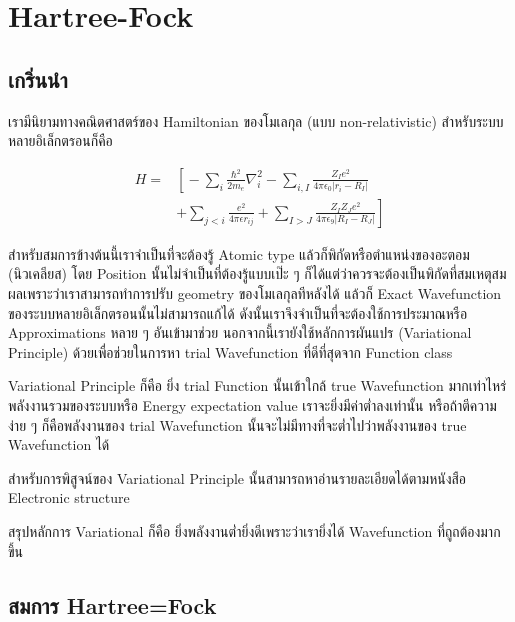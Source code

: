 
\chapter{Hartree-Fock}

\section{เกริ่นนำ}

เรามีนิยามทางคณิตศาสตร์ของ Hamiltonian ของโมเลกุล (แบบ non-relativistic) สำหรับระบบหลายอิเล็กตรอนก็คือ

\begin{equation}
    \begin{aligned}
        H = &
        \left[ \right.
        -\sum_{i} \frac{\hbar^{2}}{2m_{e}} \nabla^{2}_{i}
        -\sum_{i,I} \frac{Z_{I} e^{2}}{4\pi\epsilon_{0} |r_{i} - R_{I}|} \\
            & +\sum_{j<i} \frac{e^{2}}{4\pi\epsilon r_{ij}}
        +\sum_{I>J} \frac{Z_{I} Z_{J} e^{2}}{4\pi\epsilon_{9} |R_{I} - R_{J}|}
        \left. \right]
    \end{aligned}
\end{equation}

สำหรับสมการข้างต้นนี้เราจำเป็นที่จะต้องรู้ Atomic type แล้วก็พิกัดหรือตำแหน่งของอะตอม (นิวเคลียส)
โดย Position นั้นไม่จำเป็นที่ต้องรู้แบบเป๊ะ ๆ ก็ได้แต่ว่าควรจะต้องเป็นพิกัดที่สมเหตุสมผลเพราะว่าเราสามารถทำการปรับ
geometry ของโมเลกุลทีหลังได้ แล้วก็ Exact Wavefunction ของระบบหลายอิเล็กตรอนนั้นไม่สามารถแก้ได้
ดังนั้นเราจึงจำเป็นที่จะต้องใช้การประมาณหรือ Approximations หลาย ๆ อันเข้ามาช่วย นอกจากนี้เรายังใช้หลักการผันแปร
(Variational Principle) ด้วยเพื่อช่วยในการหา trial Wavefunction ที่ดีที่สุดจาก Function class

Variational Principle ก็คือ ยิ่ง trial Function นั้นเข้าใกล้ true Wavefunction มากเท่าไหร่
พลังงานรวมของระบบหรือ Energy expectation value เราจะยิ่งมีค่าต่ำลงเท่านั้น หรือถ้าตีความง่าย ๆ
ก็คือพลังงานของ trial Wavefunction นั้นจะไม่มีทางที่จะต่ำไปว่าพลังงานของ true Wavefunction ได้

สำหรับการพิสูจน์ของ Variational Principle นั้นสามารถหาอ่านรายละเอียดได้ตามหนังสือ Electronic
structure

สรุปหลักการ Variational ก็คือ ยิ่งพลังงานต่ำยิ่งดีเพราะว่าเรายิ่งได้ Wavefunction ที่ถูถต้องมากขึ้น

\section{สมการ Hartree=Fock}

